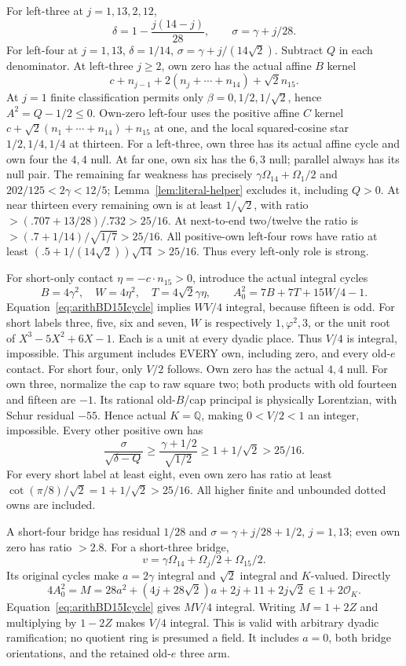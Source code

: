 \documentclass[11pt]{article}
\begin{document}
For left-three at \(j=1,13,2,12\),
\[
              \delta=1-{\frac{j(14-j)}{28}},\qquad
              \sigma=\gamma+j/28.
\]
For left-four at \(j=1,13\),
\(\delta=1/14\), \(\sigma=\gamma+j/(14\sqrt2)\).
Subtract \(Q\) in each denominator.
At left-three \(j\ge2\), own zero has the actual
affine \(B\) kernel
\[
       c+n_{j-1}+2(n_j+\cdots+n_{14})+\sqrt2n_{15}.
\]
At \(j=1\) finite classification permits only
\(\beta=0,1/2,1/\sqrt2\), hence
\(A^2=Q-1/2\le0\).
Own-zero left-four uses the positive affine \(C\)
kernel
\(c+\sqrt2(n_1+\cdots+n_{14})+n_{15}\) at one,
and the local squared-cosine star
\(1/2,1/4,1/4\) at thirteen.
For a left-three, own three has its actual affine cycle
and own four the \(4,4\) null.
At far one, own six has the \(6,3\) null; parallel
always has its null pair.
The remaining far weakness has precisely
\(\gamma\Omega_{14}+\Omega_1/2\) and
\(202/125<2\gamma<12/5\);
Lemma~\ref{lem:literal-helper} excludes it, including \(Q>0\).
At near thirteen every remaining own is at least
\(1/\sqrt2\), with ratio
\(>(.707+13/28)/.732>25/16\).
At next-to-end two/twelve the ratio is
\(>(.7+1/14)/\sqrt{1/7}>25/16\).
All positive-own left-four rows have ratio at least
\((.5+1/(14\sqrt2))\sqrt{14}>25/16\).
Thus every left-only role is strong.

For short-only contact \(\eta=-c\cdot n_{15}>0\),
introduce the actual integral cycles
\[
 B=4\gamma^2,\quad W=4\eta^2,\quad
 T=4\sqrt2\gamma\eta,\qquad
 A_0^2=7B+7T+15W/4-1.
\]
Equation~\eqref{eq:arithBD15Icycle} implies \(WV/4\)
integral, because fifteen is odd.
For short labels three, five, six and seven,
\(W\) is respectively \(1,\varphi^2,3\), or the unit
root of \(X^3-5X^2+6X-1\).
Each is a unit at every dyadic place.
Thus \(V/4\) is integral, impossible.
This argument includes EVERY own, including zero,
and every old-\(e\) contact.
For short four, only \(V/2\) follows.
Own zero has the actual \(4,4\) null.
For own three, normalize the cap to raw square two;
both products with old fourteen and fifteen are \(-1\).
Its rational old-\(B\)/cap principal is physically
Lorentzian, with Schur residual \(-55\).
Hence actual \(K=\mathbb Q\), making \(0<V/2<1\)
an integer, impossible.
Every other positive own has
\[
 {\frac{\sigma}{\sqrt{\delta-Q}}}\ge
 {\frac{\,\gamma+1/2}{\sqrt{1/2}}}\ge1+1/\sqrt2>25/16.
\]
For every short label at least eight, even own zero
has ratio at least
\(\cot(\pi/8)/\sqrt2=1+1/\sqrt2>25/16\).
All higher finite and unbounded dotted owns are included.

A short-four bridge has residual \(1/28\) and
\(\sigma=\gamma+j/28+1/2\), \(j=1,13\);
even own zero has ratio \(>2.8\).
For a short-three bridge,
\[
 v=\gamma\Omega_{14}+\Omega_j/2+\Omega_{15}/2 .
\]
Its original cycles make \(a=2\gamma\) integral
and \(\sqrt2\) integral and \(K\)-valued.
Directly
\[
 4A_0^2=M=28a^2+(4j+28\sqrt2)a+2j+11+2j\sqrt2
             \in1+2\mathcal O_K .
\]
Equation~\eqref{eq:arithBD15Icycle} gives \(MV/4\)
integral.
Writing \(M=1+2Z\) and multiplying by \(1-2Z\)
makes \(V/4\) integral.
This is valid with arbitrary dyadic ramification;
no quotient ring is presumed a field.
It includes \(a=0\), both bridge orientations,
and the retained old-\(e\) three arm.
\end{document}
